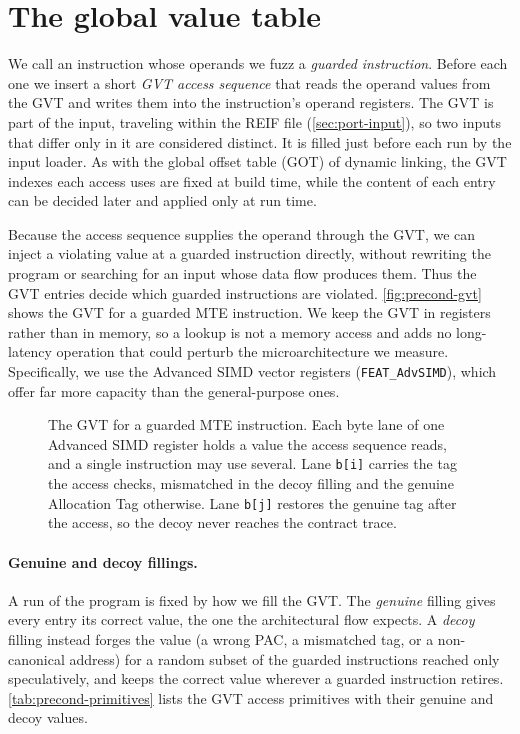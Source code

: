 \section{The global value table}
\label{sec:precond-gvt}

We call an instruction whose operands we fuzz a \emph{guarded instruction}. Before each one we
insert a short \emph{GVT access sequence} that reads the operand values from the GVT and writes them
into the instruction's operand registers. The GVT is part of the input, traveling within the REIF
file (\autoref{sec:port-input}), so two inputs that differ only in it are considered distinct. It is
filled just before each run by the input loader. As with the global offset table (GOT) of dynamic
linking, the GVT indexes each access uses are fixed at build time, while the content of each entry
can be decided later and applied only at run time.

Because the access sequence supplies the operand through the GVT, we can inject a violating value at a guarded
instruction directly, without rewriting the program or searching for an input whose data flow
produces them. Thus the GVT entries decide which guarded instructions are violated.
\autoref{fig:precond-gvt} shows the GVT for a guarded MTE instruction. We keep the GVT in registers
rather than in memory, so a lookup is not a memory access and adds no long-latency operation that
could perturb the microarchitecture we measure. Specifically, we use the Advanced SIMD vector
registers (\texttt{FEAT\_AdvSIMD}), which offer far more capacity than the general-purpose ones.

\begin{figure}[t]
\centering
\fitwidth{}
\caption{The GVT for a guarded MTE instruction. Each byte lane of one Advanced SIMD register holds a
value the access sequence reads, and a single instruction may use several. Lane \texttt{b[i]} carries
the tag the access checks, mismatched in the decoy filling and the genuine Allocation Tag otherwise.
Lane \texttt{b[j]} restores the genuine tag after the access, so the decoy never reaches the contract
trace.}
\label{fig:precond-gvt}
\end{figure}

\paragraph{Genuine and decoy fillings.}
A run of the program is fixed by how we fill the GVT. The \emph{genuine} filling gives every entry
its correct value, the one the architectural flow expects. A \emph{decoy} filling instead forges
the value (a wrong PAC, a mismatched tag, or a non-canonical address) for a random subset of the
guarded instructions reached only speculatively, and keeps the correct value wherever a guarded
instruction retires.
\autoref{tab:precond-primitives} lists the GVT access primitives with their genuine and decoy values.

